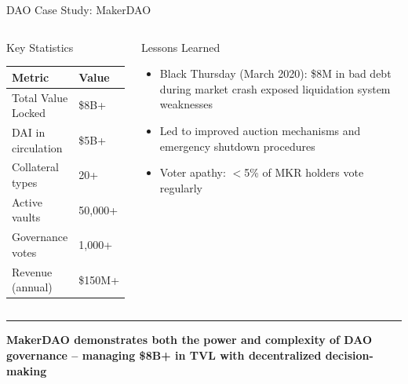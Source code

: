 \documentclass[8pt,aspectratio=169]{beamer}
\newcommand{\bottomnote}[1]{\vfill\vspace{-2mm}\textcolor{mllavender2}{\rule{\textwidth}{0.4pt}}\vspace{1mm}\footnotesize\textbf{#1}}
\begin{document}
\begin{frame}{DAO Case Study: MakerDAO}
\begin{columns}[T]
\begin{block}{Key Statistics}
\footnotesize
\begin{tabular}{l l}
\toprule
\textbf{Metric} & \textbf{Value} \\
\midrule
\rowcolor{mllavender4}
Total Value Locked & \$8B+ \\
DAI in circulation & \$5B+ \\
\rowcolor{mllavender4}
Collateral types & 20+ \\
Active vaults & 50,000+ \\
\rowcolor{mllavender4}
Governance votes & 1,000+ \\
Revenue (annual) & \$150M+ \\
\bottomrule
\end{tabular}
\end{block}
\vspace{2mm}
\begin{alertblock}{Lessons Learned}
\footnotesize
\begin{itemize}
  \item Black Thursday (March 2020): \$8M in bad debt during market crash exposed liquidation system weaknesses
  \item Led to improved auction mechanisms and emergency shutdown procedures
  \item Voter apathy: $<$5\% of MKR holders vote regularly
\end{itemize}
\end{alertblock}
\end{columns}
\bottomnote{MakerDAO demonstrates both the power and complexity of DAO governance -- managing \$8B+ in TVL with decentralized decision-making}
\end{frame}
\end{document}
